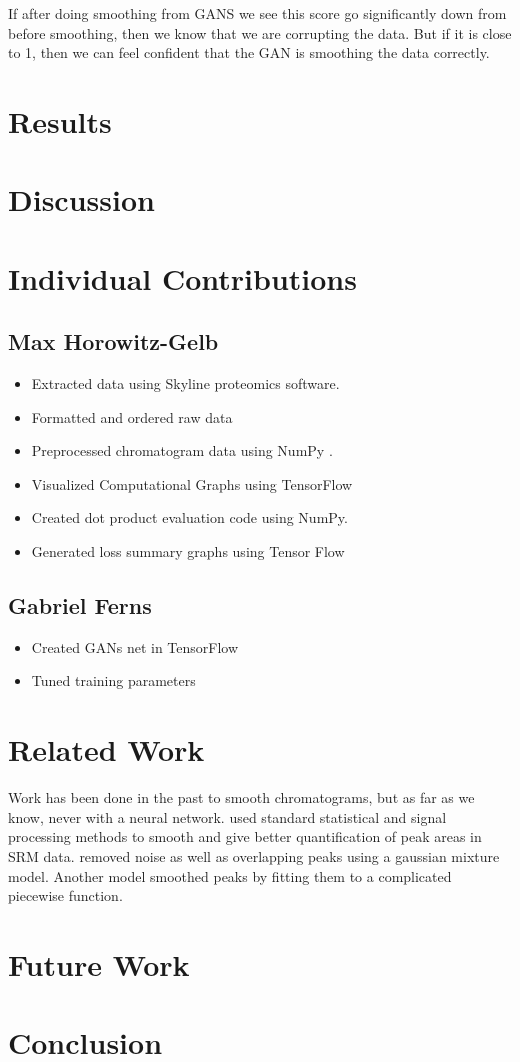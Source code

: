 \documentclass[12pt]{article}
\begin{document}
If after doing smoothing from GANS we see this score go significantly down from before smoothing, then we know that we are corrupting the data. But if it is close to 1, then we can feel confident that the GAN is smoothing the data correctly. 
\section{Results}
\section{Discussion}
\section{Individual Contributions}
\subsection{Max Horowitz-Gelb}
\begin{itemize}
\item Extracted data using Skyline \cite{Skyline} proteomics software. 
\item Formatted and ordered raw data
\item Preprocessed chromatogram data using NumPy \cite{numpy}.
\item Visualized Computational Graphs using TensorFlow \cite{TensorFlow}
\item Created dot product evaluation code using NumPy.
\item Generated loss summary graphs using Tensor Flow
\end{itemize}

\subsection{Gabriel Ferns}
\begin{itemize}
\item Created GANs net in TensorFlow
\item Tuned training parameters
\end{itemize}


\section{Related Work}
Work has been done in the past to smooth chromatograms, but as far as we know, never with a neural network. \cite{Smooth_data} used standard statistical and signal processing methods to smooth and give better quantification of peak areas in SRM data. \cite{gaussian_mixture} removed noise as well as overlapping peaks using a gaussian mixture model. Another model \cite{ASCENT} smoothed peaks by fitting them to a complicated piecewise function.
\section{Future Work}
\section{Conclusion}

{}

\end{document}
